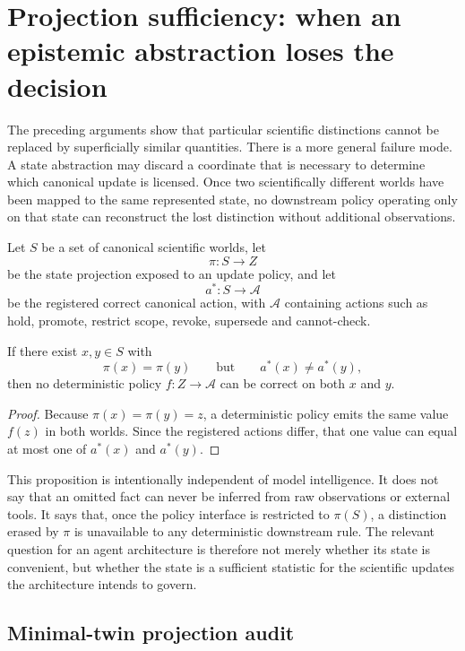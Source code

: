 \section{Projection sufficiency: when an epistemic abstraction loses the decision}

The preceding arguments show that particular scientific distinctions cannot be replaced by superficially similar quantities. There is a more general failure mode. A state abstraction may discard a coordinate that is necessary to determine which canonical update is licensed. Once two scientifically different worlds have been mapped to the same represented state, no downstream policy operating only on that state can reconstruct the lost distinction without additional observations.

Let \(S\) be a set of canonical scientific worlds, let
\[
\pi:S\longrightarrow Z
\]
be the state projection exposed to an update policy, and let
\[
a^*:S\longrightarrow\mathcal A
\]
be the registered correct canonical action, with \(\mathcal A\) containing actions such as hold, promote, restrict scope, revoke, supersede and cannot-check.

\begin{proposition}
If there exist \(x,y\in S\) with
\[
\pi(x)=\pi(y)
\qquad\text{but}\qquad
 a^*(x)\neq a^*(y),
\]
then no deterministic policy \(f:Z\to\mathcal A\) can be correct on both \(x\) and \(y\).
\end{proposition}

\begin{proof}
Because \(\pi(x)=\pi(y)=z\), a deterministic policy emits the same value \(f(z)\) in both worlds. Since the registered actions differ, that one value can equal at most one of \(a^*(x)\) and \(a^*(y)\).
\end{proof}

This proposition is intentionally independent of model intelligence. It does not say that an omitted fact can never be inferred from raw observations or external tools. It says that, once the policy interface is restricted to \(\pi(S)\), a distinction erased by \(\pi\) is unavailable to any deterministic downstream rule. The relevant question for an agent architecture is therefore not merely whether its state is convenient, but whether the state is a sufficient statistic for the scientific updates the architecture intends to govern.

\subsection{Minimal-twin projection audit}

